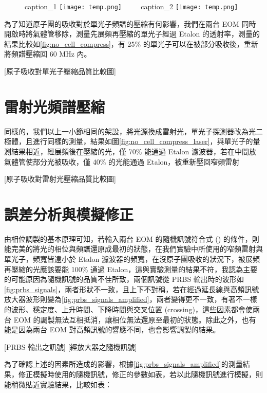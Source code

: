 \documentclass[class=NCU_thesis, crop=false]{standalone}
\begin{document}
\begin{figure}[!hbt]
    \centering
    \subcaptionbox
        {caption\_1
        \label{fig:spread_single_photon_with_etalon}}
        {\texttt{[image: temp.png]}}
    ~~~~
    \subcaptionbox
        {caption\_2
        \label{fig:compress_single_photon_with_etalon}}
        {\texttt{[image: temp.png]}}
\end{figure}

為了知道原子團的吸收對於單光子頻譜的壓縮有何影響，我們在兩台 EOM 同時開啟時將氣體管移除，測量先展頻再壓縮的單光子經過 Etalon 的透射率，測量的結果比較如\cref{fig:no_cell_compress}，有 25\% 的單光子可以在被部分吸收後，重新將頻譜壓縮回 60 MHz 內。

[原子吸收對單光子壓縮品質比較圖]

\section{雷射光頻譜壓縮}

同樣的，我們以上一小節相同的架設，將光源換成雷射光，單光子探測器改為光二極體，且進行同樣的測量，結果如圖\cref{fig:no_cell_compress_laser}，與單光子的量測結果相近，經展頻後在壓縮的光，僅 70\% 能通過 Etalon 濾波器，若在中間放氣體管使部分光被吸收，僅 40\% 的光能通過 Etalon，被重新壓回窄頻雷射

[原子吸收對雷射光壓縮品質比較圖]

\section{誤差分析與模擬修正}

由相位調製的基本原理可知，若輸入兩台 EOM 的隨機訊號符合式 () 的條件，則能完美的將光的相位與頻譜還原成最初的狀態，在我們實驗中所使用的窄頻雷射與單光子，頻寬皆遠小於 Etalon 濾波器的頻寬，在沒原子團吸收的狀況下，被展頻再壓縮的光應該要能 100\% 通過 Etalon，這與實驗測量的結果不符，我認為主要的可能原因為隨機訊號的品質不佳所致，兩個訊號從 PRBS 輸出時的波形如\cref{fig:prbs_signals}，兩者形狀不一致，且上下不對稱，若在經過延長線與高頻訊號放大器波形則變為\cref{fig:prbs_signals_amplified}，兩者變得更不一致，有著不一樣的波形、穩定度、上升時間、下降時間與交叉位置 (crossing)，這些因素都會使兩台 EOM 的調製無法互相抵消，讓相位無法還原至最初的狀態。除此之外，也有能是因為兩台 EOM 對高頻訊號的響應不同，也會影響調製的結果。

[PRBS 輸出之訊號]
[經放大器之隨機訊號]

為了確認上述的因素所造成的影響，根據\cref{fig:prbs_signals_amplified}的測量結果，修正模擬時使用的隨機訊號，修正的參數如表，若以此隨機訊號進行模擬，則能稍微貼近實驗結果，比較如表：
\end{document}
